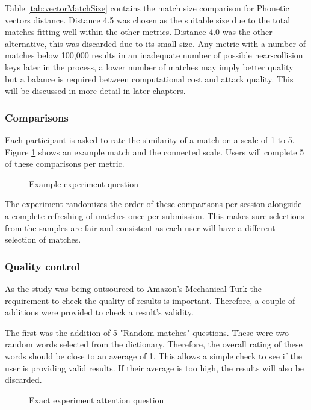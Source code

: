 Table \ref{tab:vectorMatchSize} contains the match size comparison for Phonetic vectors distance. Distance 4.5 was chosen as the suitable size due to the total matches fitting well within the other metrics. Distance 4.0 was the other alternative, this was discarded due to its small size. Any metric with a number of matches below 100,000 results in an inadequate number of possible near-collision keys later in the process, a lower number of matches may imply better quality but a balance is required between computational cost and attack quality. This will be discussed in more detail in later chapters.

\newpage

\subsubsection{Comparisons}
Each participant is asked to rate the similarity of a match on a scale of 1 to 5. Figure \ref{fig:phoneticMatch} shows an example match and the connected scale. Users will complete 5 of these comparisons per metric.

\begin{figure}[h!]
    \centering
    \caption{Example experiment question}
    \label{fig:phoneticMatch}
\end{figure}

The experiment randomizes the order of these comparisons per session alongside a complete refreshing of matches once per submission. This makes sure selections from the samples are fair and consistent as each user will have a different selection of matches.

\subsubsection{Quality control}
As the study was being outsourced to Amazon's Mechanical Turk the requirement to check the quality of results is important. Therefore, a couple of additions were provided to check a result's validity.

The first was the addition of 5 "Random matches" questions. These were two random words selected from the dictionary. Therefore, the overall rating of these words should be close to an average of 1. This allows a simple check to see if the user is providing valid results. If their average is too high, the results will also be discarded.

\begin{figure}[h!]
    \centering
    \caption{Exact experiment attention question}
    \label{fig:exactMatch}
\end{figure}

